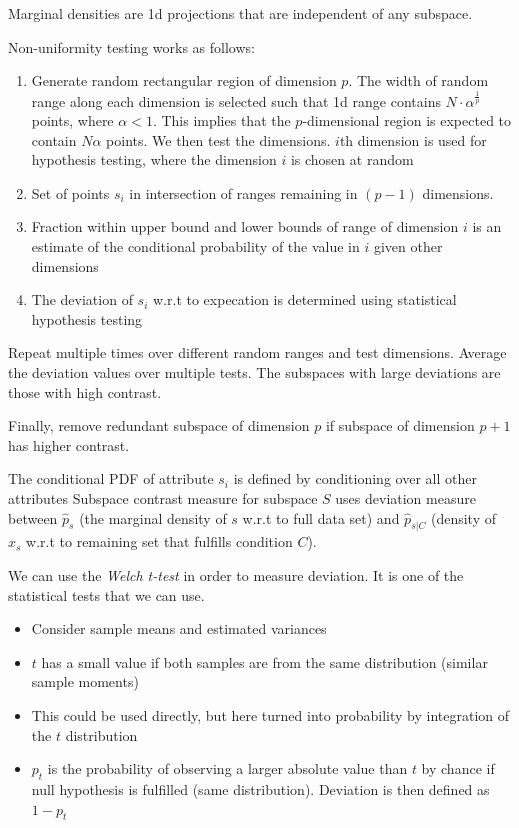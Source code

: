     Marginal densities are 1d projections that are independent of any subspace.
    
    Non-uniformity testing works as follows:
    \begin{enumerate}
        \item Generate random rectangular region of dimension $p$. The width of random range along each dimension is selected such that 1d range contains $N \cdot \alpha^{\frac{1}{p}}$ points, where $\alpha < 1$. This implies that the $p$-dimensional region is expected to contain $N \alpha$ points. We then test the dimensions. $i$th dimension is used for hypothesis testing, where the dimension $i$ is chosen at random
        \item Set of points $s_i$ in intersection of ranges remaining in $(p-1)$ dimensions. 
        \item Fraction within upper bound and lower bounds of range of dimension $i$ is an estimate of the conditional probability of the value in $i$ given other dimensions
        \item The deviation of $s_i$ w.r.t to expecation is determined using statistical hypothesis testing
    \end{enumerate}
    Repeat multiple times over different random ranges and test dimensions. Average the deviation values over multiple tests. The subspaces with large deviations are those with high contrast.
    
    Finally, remove redundant subspace of dimension $p$ if subspace of dimension $p+1$ has higher contrast.
    
    The conditional PDF of attribute $s_i$ is defined by conditioning over all other attributes 
    Subspace contrast measure for subspace $S$ uses deviation measure between $\hat{p}_s$ (the marginal density of $s$ w.r.t to full data set) and $\hat{p}_{s | C}$ (density of $x_s$ w.r.t to remaining set that fulfills condition $C$).
    
    We can use the \emph{Welch t-test} in order to measure deviation. It is one of the statistical tests that we can use. 
    \begin{itemize}
        \item Consider sample means and estimated variances
        \item $t$ has a small value if both samples are from the same distribution (similar sample moments) 
    \item This could be used directly, but here turned into probability by integration of the $t$ distribution
    \item $p_t$ is the probability of observing a larger absolute value than $t$ by chance if null hypothesis is fulfilled (same distribution). Deviation is then defined as $1 - p_t$
    \end{itemize}
    
